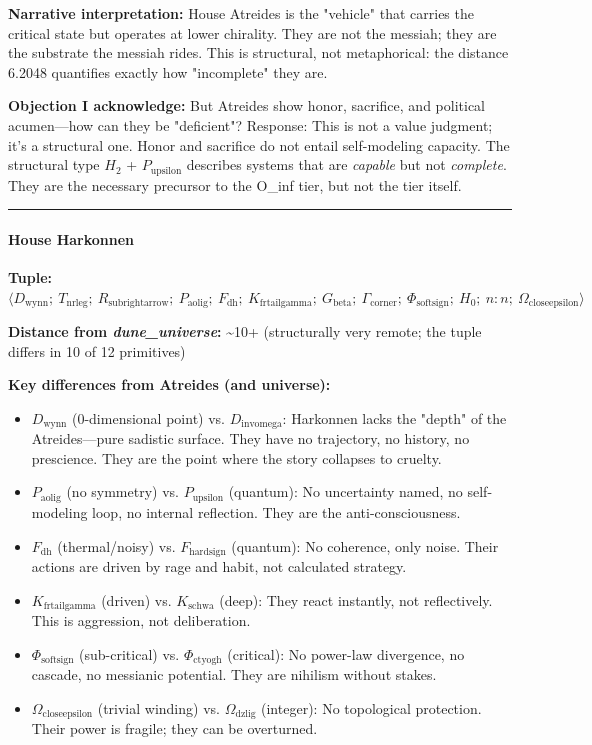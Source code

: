 \documentclass[12pt,a4paper]{article}
\begin{document}
\textbf{Narrative interpretation:} House Atreides is the "vehicle" that carries the critical state but operates at lower chirality. They are not the messiah; they are the substrate the messiah rides. This is structural, not metaphorical: the distance 6.2048 quantifies exactly how "incomplete" they are.

\textbf{Objection I acknowledge:} But Atreides show honor, sacrifice, and political acumen---how can they be "deficient"? Response: This is not a value judgment; it's a structural one. Honor and sacrifice do not entail self-modeling capacity. The structural type $H_2$ + $P_{\text{upsilon}}$ describes systems that are \emph{capable} but not \emph{complete}. They are the necessary precursor to the O\_inf tier, but not the tier itself.

\begin{center}
\rule{0.5\textwidth}{0.4pt}
\end{center}

\paragraph{House Harkonnen}

\textbf{Tuple:} $\langle D_{\text{wynn}};\ T_{\text{nrleg}};\ R_{\text{subrightarrow}};\ P_{\text{aolig}};\ F_{\text{dh}};\ K_{\text{frtailgamma}};\ G_{\text{beta}};\ \Gamma_{\text{corner}};\ \Phi_{\text{softsign}};\ H_0;\ n{:}n;\ \Omega_{\text{closeepsilon}} \rangle$

\textbf{Distance from \emph{dune\_universe}:} \textasciitilde{}10+ (structurally very remote; the tuple differs in 10 of 12 primitives)

\textbf{Key differences from Atreides (and universe):}

\begin{itemize}
    \item $D_{\text{wynn}}$ (0-dimensional point) vs. $D_{\text{invomega}}$: Harkonnen lacks the "depth" of the Atreides---pure sadistic surface. They have no trajectory, no history, no prescience. They are the point where the story collapses to cruelty.
    \item $P_{\text{aolig}}$ (no symmetry) vs. $P_{\text{upsilon}}$ (quantum): No uncertainty named, no self-modeling loop, no internal reflection. They are the anti-consciousness.
    \item $F_{\text{dh}}$ (thermal/noisy) vs. $F_{\text{hardsign}}$ (quantum): No coherence, only noise. Their actions are driven by rage and habit, not calculated strategy.
    \item $K_{\text{frtailgamma}}$ (driven) vs. $K_{\text{schwa}}$ (deep): They react instantly, not reflectively. This is aggression, not deliberation.
    \item $\Phi_{\text{softsign}}$ (sub-critical) vs. $\Phi_{\text{ctyogh}}$ (critical): No power-law divergence, no cascade, no messianic potential. They are nihilism without stakes.
    \item $\Omega_{\text{closeepsilon}}$ (trivial winding) vs. $\Omega_{\text{dzlig}}$ (integer): No topological protection. Their power is fragile; they can be overturned.
\end{itemize}
\end{document}
